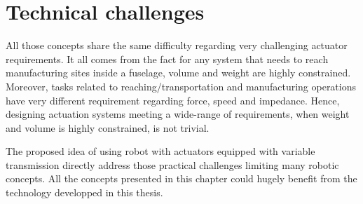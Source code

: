 \section{Technical challenges}

All those concepts share the same difficulty regarding very challenging actuator requirements. It all comes from the fact for any system that needs to reach manufacturing sites inside a fuselage, volume and weight are highly constrained. Moreover, tasks related to reaching/transportation and manufacturing operations have very different requirement regarding force, speed and impedance. Hence, designing actuation systems meeting a wide-range of requirements, when weight and volume is highly constrained, is not trivial. 

The proposed idea of using robot with actuators equipped with variable transmission directly address those practical challenges limiting many robotic concepts. All the concepts presented in this chapter could hugely benefit from the technology developped in this thesis. 